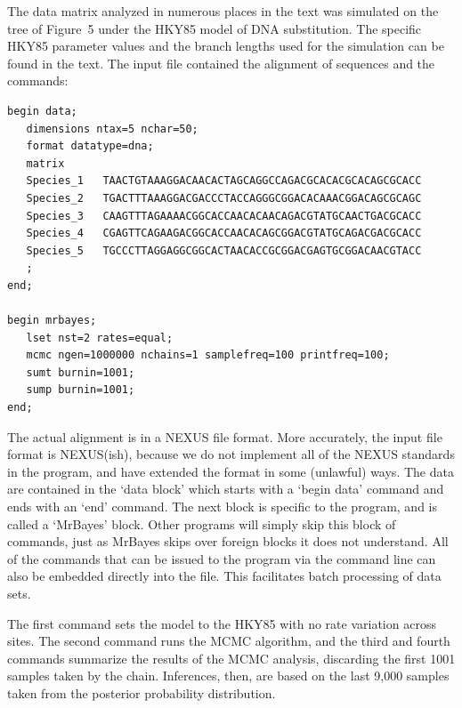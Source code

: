 \documentclass{svmult}
\begin{document}
 The data matrix analyzed in numerous
places in the text was simulated on the tree of Figure~5 under the HKY85 model of DNA substitution.
The specific HKY85 parameter values and the branch lengths used for the simulation can be found in
the text. The input file contained the alignment of sequences and the commands:
\scriptsize
 \begin{verbatim}
begin data;
   dimensions ntax=5 nchar=50;
   format datatype=dna;
   matrix
   Species_1   TAACTGTAAAGGACAACACTAGCAGGCCAGACGCACACGCACAGCGCACC 
   Species_2   TGACTTTAAAGGACGACCCTACCAGGGCGGACACAAACGGACAGCGCAGC 
   Species_3   CAAGTTTAGAAAACGGCACCAACACAACAGACGTATGCAACTGACGCACC 
   Species_4   CGAGTTCAGAAGACGGCACCAACACAGCGGACGTATGCAGACGACGCACC 
   Species_5   TGCCCTTAGGAGGCGGCACTAACACCGCGGACGAGTGCGGACAACGTACC 
   ;
end;

begin mrbayes;
   lset nst=2 rates=equal;
   mcmc ngen=1000000 nchains=1 samplefreq=100 printfreq=100;
   sumt burnin=1001;
   sump burnin=1001;
end;

\end{verbatim}
\normalsize
The actual alignment is in a NEXUS file format. More accurately, the input file format is
NEXUS(ish), because we do not implement all of the NEXUS standards in the program, and have
extended the format in some (unlawful) ways. The data are contained in the `data block' which
starts with a `begin data' command and ends with an `end' command. The next block is specific to
the program, and is called a `MrBayes'  block. Other programs will simply skip this block of
commands, just as MrBayes skips over foreign blocks it does not understand. All of the commands
that can be issued to the program via the command line can also be embedded directly into the file.
This facilitates batch processing of data sets. 

The first command sets the model to the HKY85 with no rate variation across sites. The second
command runs the MCMC algorithm, and the third and fourth commands summarize the results of the
MCMC analysis, discarding the first 1001 samples taken by the chain. Inferences, then, are based on
the last 9,000 samples taken from the posterior probability distribution.

\bigskip
\end{document}

